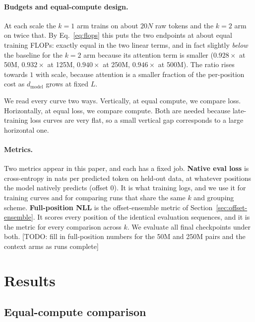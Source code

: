 \documentclass[11pt]{article}
\newcommand{\todo}[1]{\textcolor{warnred}{[TODO: #1]}}
\newcommand{\Ltr}{L}            %
\newcommand{\dmodel}{d_{\mathrm{model}}}
\begin{document}
\paragraph{Budgets and equal-compute design.}
At each scale the $k{=}1$ arm trains on about $20N$ raw tokens and the $k{=}2$
arm on twice that. By Eq.~\eqref{eq:flops} this puts the two endpoints at
about equal training FLOPs: exactly equal in the two linear terms, and in fact
slightly \emph{below} the baseline for the $k{=}2$ arm because its attention
term is smaller ($0.928\times$ at 50M, $0.932\times$ at 125M, $0.940\times$ at
250M, $0.946\times$ at 500M). The ratio rises towards $1$ with scale, because
attention is a smaller fraction of the per-position cost as $\dmodel$ grows at
fixed $\Ltr$.

We read every curve two ways. Vertically, at equal compute, we compare loss.
Horizontally, at equal loss, we compare compute. Both are needed because
late-training loss curves are very flat, so a small vertical gap corresponds
to a large horizontal one.

\paragraph{Metrics.}
Two metrics appear in this paper, and each has a fixed job. \textbf{Native
eval loss} is cross-entropy in nats per predicted token on held-out data, at
whatever positions the model natively predicts (offset 0). It is what training
logs, and we use it for training curves and for comparing runs that share the
same $k$ and grouping scheme. \textbf{Full-position NLL} is the
offset-ensemble metric of Section~\ref{sec:offset-ensemble}. It scores every
position of the identical evaluation sequences, and it is the metric for every
comparison across $k$. We evaluate all final checkpoints under both.
\todo{fill in full-position numbers for the 50M and 250M pairs and the
context arms as runs complete}

\section{Results}
\label{sec:results}

\subsection{Equal-compute comparison}
\label{sec:results-main}
\end{document}
